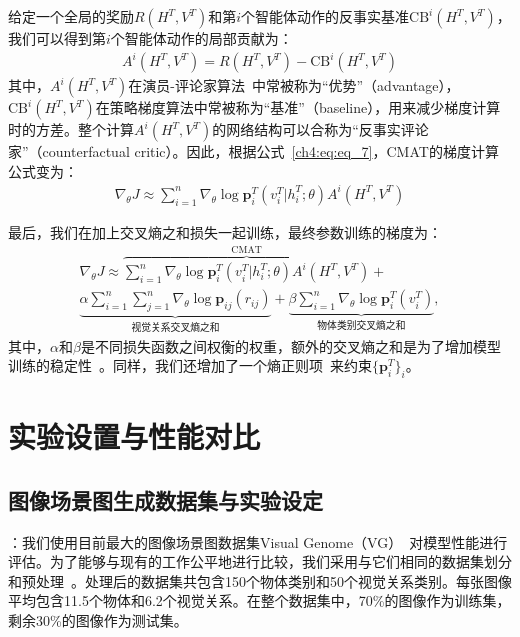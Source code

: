 给定一个全局的奖励$R(H^T, V^T)$和第$i$个智能体动作的反事实基准$\text{CB}^i(H^T, V^T)$，我们可以得到第$i$个智能体动作的局部贡献为：
\begin{align}
    A^i(H^T, V^T) = R(H^T, V^T) - \text{CB}^i(H^T, V^T)
\end{align}
其中，$A^i(H^T, V^T)$在演员-评论家算法~\cite{sutton2018reinforcement,mnih2016asynchronous}中常被称为“优势”（advantage），$\text{CB}^i(H^T, V^T)$在策略梯度算法中常被称为“基准”（baseline），用来减少梯度计算时的方差。整个计算$A^i(H^T, V^T)$的网络结构可以合称为“反事实评论家”（counterfactual critic）。因此，根据公式~\eqref{ch4:eq:eq_7}，CMAT的梯度计算公式变为：
\begin{align}
\nabla_{\theta} J \approx \sum^n_{i=1} \nabla_{\theta} \log \bm{p}^T_i (v^T_i|h^T_i; \theta) A^i(H^T, V^T)
\end{align}

最后，我们在加上交叉熵之和损失一起训练，最终参数训练的梯度为：
\begin{equation}
\begin{split}
\nabla_{\theta} J \approx  \overbrace{\sum^n_{i=1} \nabla_{\theta} \log \bm{p}^T_i (v^T_i|h^T_i; \theta) A^i(H^T, V^T)}^{\text{CMAT}} + \\
\underbrace{\alpha\sum^n_{i=1}\sum^n_{j=1} \nabla_{\theta} \log \bm{p}_{ij}(r_{ij})}_{\text{视觉关系交叉熵之和}} + 
\underbrace{\beta \sum^n_{i=1} \nabla_{\theta} \log \bm{p}^T_i(v^T_i)}_{\text{物体类别交叉熵之和}},
\end{split}
\end{equation}
其中，$\alpha$和$\beta$是不同损失函数之间权衡的权重，额外的交叉熵之和是为了增加模型训练的稳定性~\cite{rao2018learning}。同样，我们还增加了一个熵正则项~\cite{xu2015show, hu2017learning}来约束$\{\bm{p}^T_i\}_i$。



\section{实验设置与性能对比}
\subsection{图像场景图生成数据集与实验设定}

\textbf{}：我们使用目前最大的图像场景图数据集Visual Genome（VG）~\cite{krishna2017visual}对模型性能进行评估。为了能够与现有的工作公平地进行比较，我们采用与它们相同的数据集划分和预处理~\cite{xu2017scene, zellers2018neural, newell2017pixels, yang2018graph, herzig2018mapping}。处理后的数据集共包含150个物体类别和50个视觉关系类别。每张图像平均包含11.5个物体和6.2个视觉关系。在整个数据集中，70\%的图像作为训练集，剩余30\%的图像作为测试集。


